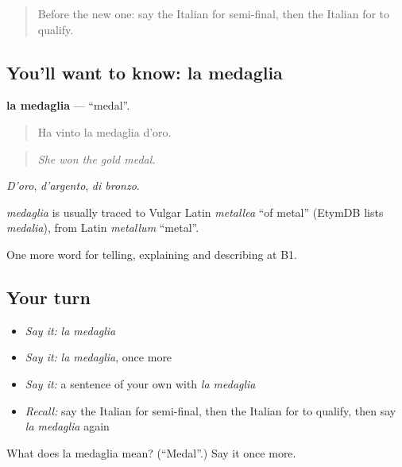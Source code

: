 \begin{quote}
Before the new one: say the Italian for semi-final, then the Italian for to qualify.
\end{quote}

\subsection*{You'll want to know: la medaglia}
\textbf{la medaglia} — \textquotedblleft{}medal\textquotedblright{}.

\begin{quote}
Ha vinto la medaglia d'oro.
\end{quote}

\begin{quote}
\emph{She won the gold medal.}
\end{quote}

\emph{D'oro}, \emph{d'argento}, \emph{di bronzo}.

\begin{cousinweb}
\emph{medaglia} is usually traced to Vulgar Latin \emph{metallea} \textquotedblleft{}of metal\textquotedblright{} (EtymDB lists \emph{medalia}), from Latin \emph{metallum} \textquotedblleft{}metal\textquotedblright{}.
\end{cousinweb}

\begin{grammarlens}[title={What you've built}]
One more word for telling, explaining and describing at B1.
\end{grammarlens}

\subsection*{Your turn}
\begin{itemize}
\raggedright
  \item \emph{Say it:} \emph{la medaglia}
  \item \emph{Say it:} \emph{la medaglia}, once more
  \item \emph{Say it:} a sentence of your own with \emph{la medaglia}
  \item \emph{Recall:} say the Italian for semi-final, then the Italian for to qualify, then say \emph{la medaglia} again
\end{itemize}

\begin{tcolorbox}[breakable,colback=teal!4,colframe=teal!35!black,title={Before you move on}]
What does la medaglia mean? (\textquotedblleft{}Medal\textquotedblright{}.) Say it once more.
\end{tcolorbox}
